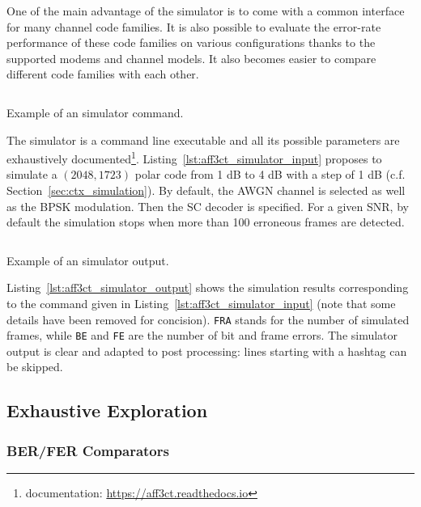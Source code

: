 One of the main advantage of the \AFFECT simulator is to come with a common
interface for many channel code families. It is also possible to evaluate the
error-rate performance of these code families on various configurations thanks
to the supported modems and channel models. It also becomes easier to compare
different code families with each other.

\begin{listing}[htp]
  \inputminted[frame=lines]{bash}{main/chapter4/src/use_cases/simulator/input.txt}
  \caption{Example of an \AFFECT simulator command.}
  \label{lst:aff3ct_simulator_input}
\end{listing}

The \AFFECT simulator is a command line executable and all its possible
parameters are exhaustively documented\footnote{\AFFECT documentation:
\url{https://aff3ct.readthedocs.io}}. Listing~\ref{lst:aff3ct_simulator_input}
proposes to simulate a $(2048,1723)$ polar code from 1 dB to 4 dB with a step of
1 dB (c.f. Section~\ref{sec:ctx_simulation}). By default, the AWGN channel is
selected as well as the BPSK modulation. Then the SC decoder is specified. For a
given SNR, by default the simulation stops when more than 100 erroneous frames
are detected.

\begin{listing}[htp]
  \inputminted[frame=lines,linenos]{console}{main/chapter4/src/use_cases/simulator/output.txt}
  \caption{Example of an \AFFECT simulator output.}
  \label{lst:aff3ct_simulator_output}
\end{listing}

Listing~\ref{lst:aff3ct_simulator_output} shows the simulation results
corresponding to the \AFFECT command given in
Listing~\ref{lst:aff3ct_simulator_input} (note that some details have been
removed for concision). \verb|FRA| stands for the number of simulated frames,
while \verb|BE| and \verb|FE| are the number of bit and frame errors. The
simulator output is clear and adapted to post processing: lines starting with a
hashtag can be skipped.

\subsection{Exhaustive Exploration}


\subsubsection{BER/FER Comparators} %

